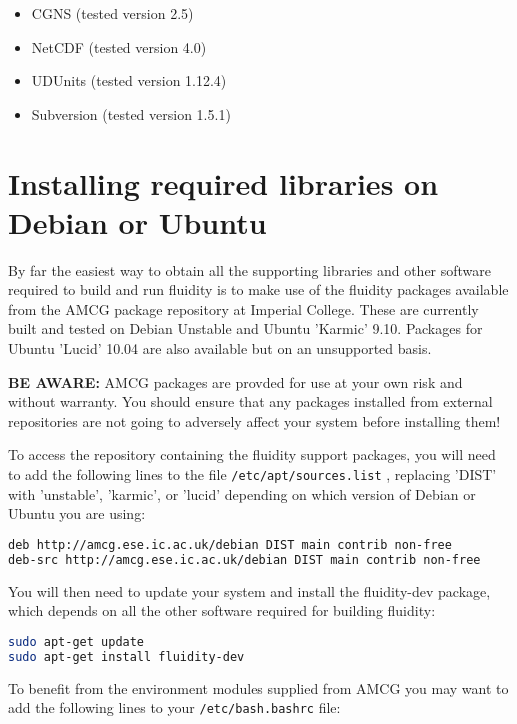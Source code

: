 \begin{itemize}
\item CGNS (tested version 2.5)
\item NetCDF (tested version 4.0)
\item UDUnits (tested version 1.12.4)
\item Subversion (tested version 1.5.1)
\end{itemize}

\section{Installing required libraries on Debian or Ubuntu}
\label{sect:required_ḻibraries_debian}

By far the easiest way to obtain all the supporting libraries and other
software required to build and run fluidity is to make use of the fluidity
packages available from the AMCG package repository at Imperial College. These
are currently built and tested on Debian Unstable and Ubuntu 'Karmic' 9.10.
Packages for Ubuntu 'Lucid' 10.04 are also available but on an unsupported
basis.

\textbf{BE AWARE:} AMCG packages are provded for use at your own risk and
without warranty. You should ensure that any packages installed from external
repositories are not going to adversely affect your system before installing
them!

To access the repository containing the fluidity support packages, you will
need to add the following lines to the file
\lstinline[language=bash]+/etc/apt/sources.list+ , replacing 'DIST' with
'unstable', 'karmic', or 'lucid' depending on which version of Debian or Ubuntu
you are using:

\begin{lstlisting}[language=bash]
deb http://amcg.ese.ic.ac.uk/debian DIST main contrib non-free
deb-src http://amcg.ese.ic.ac.uk/debian DIST main contrib non-free
\end{lstlisting}

You will then need to update your system and install the fluidity-dev package,
which depends on all the other software required for building fluidity:

\begin{lstlisting}[language=bash]
sudo apt-get update
sudo apt-get install fluidity-dev
\end{lstlisting}

To benefit from the environment modules supplied from AMCG you may want to add
the following lines to your \lstinline[language=bash]+/etc/bash.bashrc+ file:

